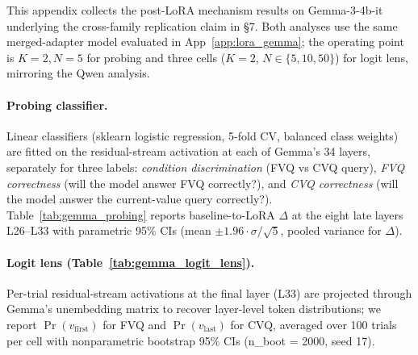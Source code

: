 \documentclass[letterpaper]{article} %
\begin{document}
This appendix collects the post-LoRA mechanism results on
Gemma-3-4b-it underlying the cross-family replication claim in
\S7. Both analyses use the same merged-adapter
model evaluated in App~\ref{app:lora_gemma}; the operating point is
$K{=}2, N{=}5$ for probing and three cells ($K{=}2$, $N \in
\{5, 10, 50\}$) for logit lens, mirroring the Qwen analysis.

\paragraph{Probing classifier.}
Linear classifiers (sklearn logistic regression, 5-fold CV, balanced
class weights) are fitted on the residual-stream activation at each
of Gemma's 34 layers, separately for three labels: \emph{condition
discrimination} (FVQ vs CVQ query), \emph{FVQ correctness} (will the
model answer FVQ correctly?), and \emph{CVQ correctness} (will the
model answer the current-value query correctly?).
Table~\ref{tab:gemma_probing} reports baseline-to-LoRA $\Delta$ at
the eight late layers L26--L33 with parametric 95\% CIs
(mean $\pm 1.96 \cdot \sigma / \sqrt{5}$, pooled variance for
$\Delta$).

\begin{table}[t]
\centering
\footnotesize
\setlength{\tabcolsep}{3pt}

\caption{Gemma-3-4b-it: $\Delta$ (LoRA $-$ base) in probing accuracy
across late layers, with 95\% CIs. Bold entries exclude zero. The
condition-discrimination probe saturates pre-LoRA in both
architectures. FVQ-correctness is broadly unchanged. CVQ-correctness
$\Delta$ is positive and statistically distinguishable from zero at
all eight late layers, mirroring the Qwen result of
Table~5.}
\label{tab:gemma_probing}
\end{table}

\paragraph{Logit lens (Table~\ref{tab:gemma_logit_lens}).}
Per-trial residual-stream activations at the final layer (L33) are
projected through Gemma's unembedding matrix to recover layer-level
token distributions; we report $\Pr(v_{\mathrm{first}})$ for FVQ and
$\Pr(v_{\mathrm{last}})$ for CVQ, averaged over 100 trials per cell
with nonparametric bootstrap 95\% CIs (n\_boot = 2000, seed 17).

\begin{table}[t]
\centering
\scriptsize

\caption{Gemma-3-4b-it logit lens at L33 (final layer), baseline vs
LoRA, three cells. Bold $\Delta$ entries exclude zero. The pre-LoRA
$\Pr(v_{\mathrm{last}})$ at the final layer is $0.56$--$0.80$
across these cells (compared with $0.11$ in Qwen at $K{=}2, N{=}5$);
the post-LoRA value is $0.99$--$1.00$ across all three cells. The
starting points differ between architectures, but the post-LoRA
endpoints coincide.}
\label{tab:gemma_logit_lens}
\end{table}
\end{document}
